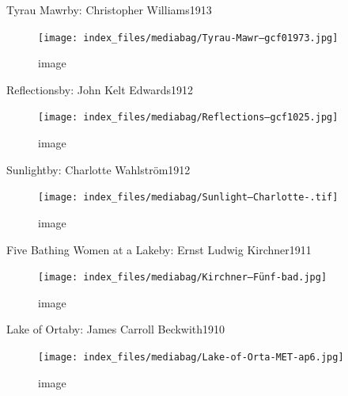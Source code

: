\documentclass[
  a4paper,
]{book}
\begin{document}
\label{http:ux2fux2fwww.wikidata.orgux2fentityux2fQ76998117}
Tyrau Mawrby: Christopher Williams1913

\begin{figure}[H]

{\centering \texttt{[image: index\_files/mediabag/Tyrau-Mawr--gcf01973.jpg]}

}

\caption{image}

\end{figure}%

\label{http:ux2fux2fwww.wikidata.orgux2fentityux2fQ76997813}
Reflectionsby: John Kelt Edwards1912

\begin{figure}[H]

{\centering \texttt{[image: index\_files/mediabag/Reflections--gcf1025.jpg]}

}

\caption{image}

\end{figure}%

\label{http:ux2fux2fwww.wikidata.orgux2fentityux2fQ131100175}
Sunlightby: Charlotte Wahlström1912

\begin{figure}[H]

{\centering \texttt{[image: index\_files/mediabag/Sunlight--Charlotte-.tif]}

}

\caption{image}

\end{figure}%

\label{http:ux2fux2fwww.wikidata.orgux2fentityux2fQ8563481}
Five Bathing Women at a Lakeby: Ernst Ludwig Kirchner1911

\begin{figure}[H]

{\centering \texttt{[image: index\_files/mediabag/Kirchner---Fünf-bad.jpg]}

}

\caption{image}

\end{figure}%

\label{http:ux2fux2fwww.wikidata.orgux2fentityux2fQ19925715}
Lake of Ortaby: James Carroll Beckwith1910

\begin{figure}[H]

{\centering \texttt{[image: index\_files/mediabag/Lake-of-Orta-MET-ap6.jpg]}

}

\caption{image}

\end{figure}%
\end{document}
